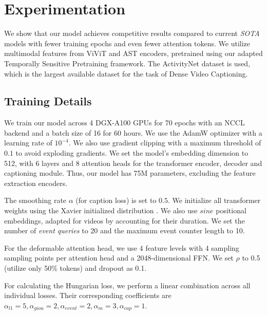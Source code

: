 \section{Experimentation}
\par We show that our model achieves competitive results compared to current \textit{SOTA} models with fewer training epochs and even fewer attention tokens. We utilize multimodal features from ViViT and AST encoders, pretrained using our adapted Temporally Sensitive Pretraining framework. The ActivityNet dataset is used, which is the largest available dataset for the task of Dense Video Captioning.


\subsection {Training Details}
\par We train our model across 4 DGX-A100 GPUs for 70 epochs with an NCCL backend and a batch size of 16 for 60 hours. We use the AdamW optimizer with a learning rate of $10^{-4}$. We also use gradient clipping with a maximum threshold of $0.1$ to avoid exploding gradients. We set the model's embedding dimension to 512, with 6 layers and 8 attention heads for the transformer encoder, decoder and captioning module. Thus, our model has 75M parameters, excluding the feature extraction encoders. 
\par The smoothing rate $\alpha$ (for caption loss) is set to $0.5$. We initialize all transformer weights using the Xavier initialized distribution \cite{xavier}. We also use $sine$ positional embeddings, adapted for videos by accounting for their duration. We set the number of \textit{event queries} to 20 and the maximum event counter length to 10.
\par For the deformable attention head, we use 4 feature levels with 4 sampling sampling points per attention head and a 2048-dimensional FFN. We set $\rho$ to 0.5 (utilize only 50\% tokens) and dropout as 0.1.
\par For calculating the Hungarian loss, we perform a linear combination across all individual losses. Their corresponding coefficients are $\alpha_{l1}=5, \alpha_{giou}=2, \alpha_{event}=2, \alpha_m=3, \alpha_{cap}=1$.


